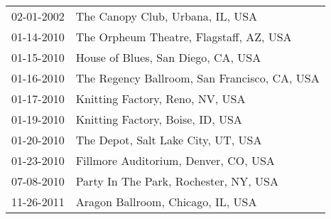 \begin{supertabular}{ll}
 02-01-2002 &              The Canopy Club, Urbana, IL, USA \\
 01-14-2010 &       The Orpheum Theatre, Flagstaff, AZ, USA \\
 01-15-2010 &            House of Blues, San Diego, CA, USA \\
 01-16-2010 &  The Regency Ballroom, San Francisco, CA, USA \\
 01-17-2010 &               Knitting Factory, Reno, NV, USA \\
 01-19-2010 &              Knitting Factory, Boise, ID, USA \\
 01-20-2010 &            The Depot, Salt Lake City, UT, USA \\
 01-23-2010 &          Fillmore Auditorium, Denver, CO, USA \\
 07-08-2010 &         Party In The Park, Rochester, NY, USA \\
 11-26-2011 &             Aragon Ballroom, Chicago, IL, USA \\
\end{supertabular}
